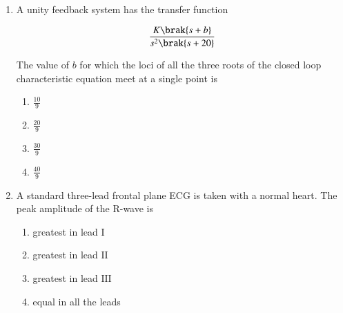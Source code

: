 \documentclass[journal,12pt,onecolumn]{IEEEtran}
\theoremstyle{remark}
\begin{document}
\begin{enumerate}
 \par\vspace{0.2cm}
Here $\vec{x}$ is the state vector, $u$ is the input and $y$ is the output. \\
The damping ratio of the system is \par \hfill{}
\begin{multicols}{4}
    \begin{enumerate}
        \item $0.25$
        \item $0.5$
        \item $1$
        \item $2$
\end{enumerate}
\end{multicols} 

\vspace{0.5cm}

\item A unity feedback system has the transfer function\par

$$\frac{K\brak{s+b}}{s^2\brak{s+20}}$$\par

The value of $b$ for which the loci of all the three roots of the closed loop characteristic equation meet at a single point is \par \hfill{}
\begin{multicols}{4}
    \begin{enumerate}
        \item $\frac{10}{9}$
        \item $\frac{20}{9}$
        \item $\frac{30}{9}$
        \item $\frac{40}{9}$
\end{enumerate}
\end{multicols} 

\vspace{0.5cm}

\item A standard three-lead frontal plane ECG is taken with a normal heart. The peak amplitude of the R-wave is \par \hfill{}
\begin{enumerate}
        \item greatest in lead $\mathrm{I}$
        \item greatest in lead $\mathrm{II}$
        \item greatest in lead $\mathrm{III}$
        \item equal in all the leads
\end{enumerate} 


\end{enumerate}
\end{document}
